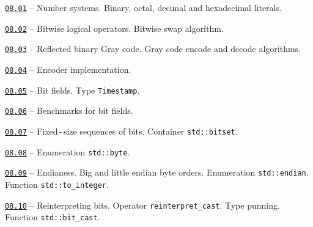 \documentclass[a4paper,12pt]{article}
\renewenvironment{itemize}
{
    \begin{list}{\labelitemi}
    {
      \setlength{\topsep}{0pt}
      \setlength{\partopsep}{0pt}
      \setlength{\parskip}{0pt}
      \setlength{\itemsep}{0pt}
      \setlength{\parsep}{0pt}
      \setlength{\leftmargin}{14.5pt}
    }
}{\end{list}}
\begin{document}
\begin{itemize}

    \item \href{https://github.com/i-s-m-mipt/Education/blob/master/projects/examples/source/08.01.cpp}{\texttt{08.01}} -- Number systems. Binary, octal, decimal and hexadecimal literals.

    \smallskip

    \item \href{https://github.com/i-s-m-mipt/Education/blob/master/projects/examples/source/08.02.cpp}{\texttt{08.02}} -- Bitwise logical operators. Bitwise swap algorithm.

    \smallskip

    \item \href{https://github.com/i-s-m-mipt/Education/blob/master/projects/examples/source/08.03.cpp}{\texttt{08.03}} -- Reflected binary Gray code. Gray code encode and decode algorithms.

    \smallskip

    \item \href{https://github.com/i-s-m-mipt/Education/blob/master/projects/examples/source/08.04.pdf}{\texttt{08.04}} -- Encoder implementation.

    \smallskip

    \item \href{https://github.com/i-s-m-mipt/Education/blob/master/projects/examples/source/08.05.cpp}{\texttt{08.05}} -- Bit fields. Type \lstinline{Timestamp}.

    \smallskip

    \item \href{https://github.com/i-s-m-mipt/Education/blob/master/projects/examples/source/08.06.cpp}{\texttt{08.06}} -- Benchmarks for bit fields.

    \smallskip

    \item \href{https://github.com/i-s-m-mipt/Education/blob/master/projects/examples/source/08.07.cpp}{\texttt{08.07}} -- Fixed\,-\,size sequences of bits. Container \lstinline{std::bitset}.

    \smallskip

    \item \href{https://github.com/i-s-m-mipt/Education/blob/master/projects/examples/source/08.08.cpp}{\texttt{08.08}} -- Enumeration \lstinline{std::byte}.

    \smallskip

    \item \href{https://github.com/i-s-m-mipt/Education/blob/master/projects/examples/source/08.09.cpp}{\texttt{08.09}} -- Endianess. Big and little endian byte orders. Enumeration \lstinline{std::endian}. Function \lstinline{std::to_integer}.

    \smallskip

    \item \href{https://github.com/i-s-m-mipt/Education/blob/master/projects/examples/source/08.10.cpp}{\texttt{08.10}} -- Reinterpreting bits. Operator \lstinline{reinterpret_cast}. Type punning. Function \lstinline{std::bit_cast}.

\end{itemize}
\end{document}
